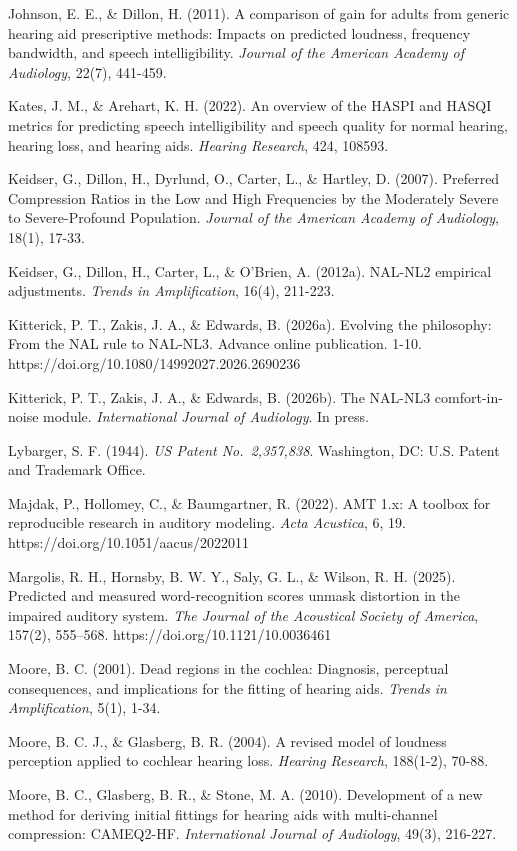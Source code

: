 \documentclass[
  12pt,
]{article}
\begin{document}
Johnson, E. E., \& Dillon, H. (2011). A comparison of gain for adults
from generic hearing aid prescriptive methods: Impacts on predicted
loudness, frequency bandwidth, and speech intelligibility. \emph{Journal
of the American Academy of Audiology}, 22(7), 441-459.

Kates, J. M., \& Arehart, K. H. (2022). An overview of the HASPI and
HASQI metrics for predicting speech intelligibility and speech quality
for normal hearing, hearing loss, and hearing aids. \emph{Hearing
Research}, 424, 108593.

Keidser, G., Dillon, H., Dyrlund, O., Carter, L., \& Hartley, D. (2007).
Preferred Compression Ratios in the Low and High Frequencies by the
Moderately Severe to Severe-Profound Population. \emph{Journal of the
American Academy of Audiology}, 18(1), 17-33.

Keidser, G., Dillon, H., Carter, L., \& O'Brien, A. (2012a). NAL-NL2
empirical adjustments. \emph{Trends in Amplification}, 16(4), 211-223.

Kitterick, P. T., Zakis, J. A., \& Edwards, B. (2026a). Evolving the
philosophy: From the NAL rule to NAL-NL3. Advance online publication.
1-10. https://doi.org/10.1080/14992027.2026.2690236

Kitterick, P. T., Zakis, J. A., \& Edwards, B. (2026b). The NAL-NL3
comfort-in-noise module. \emph{International Journal of Audiology}. In
press.

Lybarger, S. F. (1944). \emph{US Patent No.~2,357,838}. Washington, DC:
U.S. Patent and Trademark Office.

Majdak, P., Hollomey, C., \& Baumgartner, R. (2022). AMT 1.x: A toolbox
for reproducible research in auditory modeling. \emph{Acta Acustica}, 6,
19. https://doi.org/10.1051/aacus/2022011

Margolis, R. H., Hornsby, B. W. Y., Saly, G. L., \& Wilson, R. H.
(2025). Predicted and measured word-recognition scores unmask distortion
in the impaired auditory system. \emph{The Journal of the Acoustical
Society of America}, 157(2), 555--568.
https://doi.org/10.1121/10.0036461

Moore, B. C. (2001). Dead regions in the cochlea: Diagnosis, perceptual
consequences, and implications for the fitting of hearing aids.
\emph{Trends in Amplification}, 5(1), 1-34.

Moore, B. C. J., \& Glasberg, B. R. (2004). A revised model of loudness
perception applied to cochlear hearing loss. \emph{Hearing Research},
188(1-2), 70-88.

Moore, B. C., Glasberg, B. R., \& Stone, M. A. (2010). Development of a
new method for deriving initial fittings for hearing aids with
multi-channel compression: CAMEQ2-HF. \emph{International Journal of
Audiology}, 49(3), 216-227.
\end{document}
